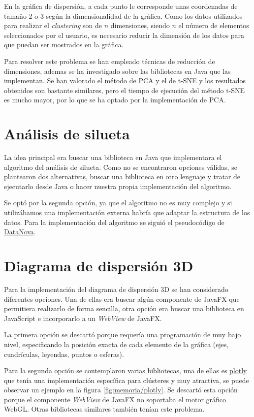 En la gráfica de dispersión, a cada punto le corresponde unas coordenadas de tamaño 2 o 3 según la dimensionalidad de la gráfica. Como los datos utilizados para realizar el \emph{clustering} son de $n$ dimensiones, siendo $n$ el número de elementos seleccionados por el usuario, es necesario reducir la dimensión de los datos para que puedan ser mostrados en la gráfica.

Para resolver este problema se han empleado técnicas de reducción de dimensiones, ademas se ha investigado sobre las bibliotecas en Java que las implementan. Se han valorado el método de PCA y el de t-SNE y los resultados obtenidos son bastante similares, pero el tiempo de ejecución del método t-SNE es mucho mayor, por lo que se ha optado por la implementación de PCA.

\section{Análisis de silueta}
La idea principal era buscar una biblioteca en Java que implementara el algoritmo del análisis de silueta. Como no se encontraron opciones válidas, se plantearon dos alternativas, buscar una biblioteca en otro lenguaje y tratar de ejecutarlo desde Java o hacer nuestra propia implementación del algoritmo.

Se optó por la segunda opción, ya que el algoritmo no es muy complejo y si utilizábamos una implementación externa habría que adaptar la estructura de los datos. Para la implementación del algoritmo se siguió el pseudocódigo de \href{https://www.datanovia.com/en/lessons/cluster-validation-statistics-must-know-methods/#silhouette-coefficient}{DataNova}.

\section{Diagrama de dispersión 3D}
Para la implementación del diagrama de dispersión 3D se han considerado diferentes opciones. Una de ellas era buscar algún componente de JavaFX que permitiera realizarlo de forma sencilla, otra opción era buscar una biblioteca en JavaScript e incorporarlo a un \emph{WebView} de JavaFX.

La primera opción se descartó porque requería una programación de muy bajo nivel, especificando la posición exacta de cada elemento de la gráfica (ejes, cuadrículas, leyendas, puntos o esferas).

Para la segunda opción se contemplaron varias bibliotecas, una de ellas es \href{https://plotly.com/}{plotly} que tenía una implementación específica para clústeres y muy atractiva, se puede observar un ejemplo en la figura \ref{fig:memoria/plotly}. Se descartó esta opción porque el componente \emph{WebView} de JavaFX no soportaba el motor gráfico WebGL. Otras bibliotecas similares también tenían este problema.

